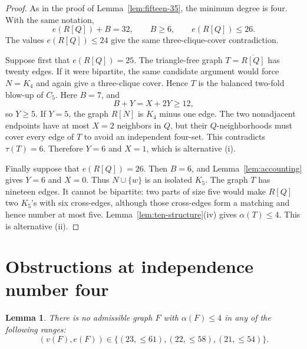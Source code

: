 \documentclass[11pt,reqno,a4paper]{amsart}
\newtheorem{lemma}[theorem]{Lemma}
\theoremstyle{definition}
\theoremstyle{remark}
\newcommand{\comp}[1]{\overline{#1}}
\begin{document}
\begin{proof}
As in the proof of Lemma~\ref{lem:fifteen-35}, the minimum degree is four.
With the same notation,
\begin{equation}\label{eq:R36-split}
  e(R[Q])+B=32,\qquad B\geq6,\qquad e(R[Q])\leq26.
\end{equation}
The values $e(R[Q])\leq24$ give the same three-clique-cover contradiction.

Suppose first that $e(R[Q])=25$.  The triangle-free graph
$T=\comp{R[Q]}$ has twenty edges.  If it were bipartite, the same candidate
argument would force $N=K_4$ and again give a three-clique cover.  Hence
$T$ is the balanced two-fold blow-up of $C_5$.  Here $B=7$, and
\[
  B+Y=X+2Y\geq12,
\]
so $Y\geq5$.  If $Y=5$, the graph $R[N]$ is $K_4$ minus one edge.  The two
nonadjacent endpoints have at most $X=2$ neighbors in $Q$, but their
$Q$-neighborhoods must cover every edge of $T$ to avoid an independent
four-set.  This contradicts $\tau(T)=6$.  Therefore $Y=6$ and $X=1$,
which is alternative (i).

Finally suppose that $e(R[Q])=26$.  Then $B=6$, and
Lemma~\ref{lem:accounting} gives $Y=6$ and $X=0$.  Thus $N\cup\{w\}$ is an
isolated $K_5$.  The graph $T$ has nineteen edges.  It cannot be bipartite:
two parts of size five would make $R[Q]$ two $K_5$'s with six cross-edges,
although those cross-edges form a matching and hence number at most five.
Lemma~\ref{lem:ten-structure}(iv) gives $\alpha(T)\leq4$.  This is
alternative (ii).
\end{proof}

\section{Obstructions at independence number four}\label{sec:alpha4}

\begin{lemma}\label{lem:alpha4-obstruction}
There is no admissible graph $F$ with $\alpha(F)\leq4$ in any of the
following ranges:
\[
  (v(F),e(F))\in
  \{(23,{\leq}61),(22,{\leq}58),(21,{\leq}54)\}.
\]
\end{lemma}
\end{document}
